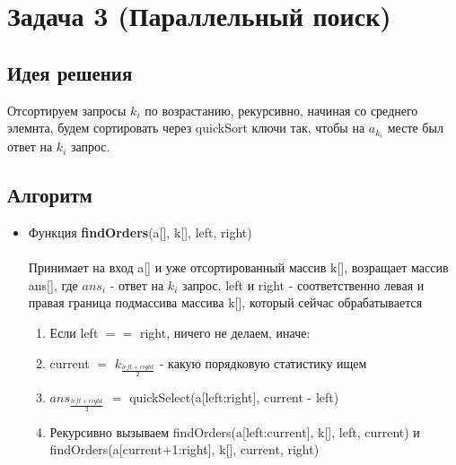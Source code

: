\section{Задача 3 (Параллельный поиск)}
\subsection{Идея решения}
Отсортируем запросы $k_i$ по возрастанию, рекурсивно, начиная со среднего элемнта, будем сортировать через quickSort ключи так, чтобы на $a_{k_i}$ месте был ответ на $k_i$ запрос.

\subsection{Алгоритм}
\begin{itemize}
    \item Функция \textbf{findOrders}(a[], k[], left, right)\\\\
    Принимает на вход a[] и уже отсортированный массив k[], возращает массив ans[], где ${ans}_i$ - ответ на $k_i$ запрос. left и right - соответственно левая и правая граница подмассива массива k[], который сейчас обрабатывается
    \begin{enumerate}
        \item Если left $==$ right, ничего не делаем, иначе:
        \item current $=$ $k_{\frac{left + right}{2}}$ - какую порядковую статистику ищем
        \item ${ans}_{\frac{left + right}{2}}$ $=$ quickSelect(a[left:right], current - left)
        \item Рекурсивно вызываем findOrders(a[left:current], k[], left, current) и findOrders(a[current+1:right], k[], current, right)
    \end{enumerate}


\end{itemize}
